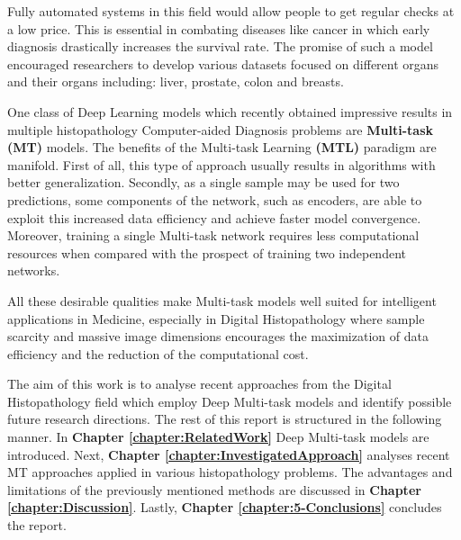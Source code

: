 Fully automated systems in this field would allow people to get regular checks at a low price. This is essential in combating diseases like cancer in which early diagnosis drastically increases the survival rate. The promise of such a model encouraged researchers to develop various datasets focused on different organs and their organs including: liver, prostate, colon and breasts.

One class of Deep Learning models which recently obtained impressive results in multiple histopathology Computer-aided Diagnosis problems are \textbf{Multi-task (MT)} models. The benefits of the Multi-task Learning \textbf{(MTL)} paradigm \cite{caruana1997multitask} are manifold. First of all, this type of approach usually results in algorithms with better generalization. Secondly, as a single sample may be used for two predictions, some components of the network, such as encoders, are able to exploit this increased data efficiency and achieve faster model convergence. Moreover, training a single Multi-task network requires less computational resources when compared with the prospect of training two independent networks. 

All these desirable qualities make Multi-task models well suited for intelligent applications in Medicine, especially in Digital Histopathology where sample scarcity and massive image dimensions encourages the maximization of data efficiency and the reduction of the computational cost. 

The aim of this work is to analyse recent approaches from the Digital Histopathology field which employ Deep Multi-task models and identify possible future research directions. The rest of this report is structured in the following manner. In \textbf{Chapter \ref{chapter:RelatedWork}} Deep Multi-task models are introduced. Next, \textbf{Chapter \ref{chapter:InvestigatedApproach}} analyses recent MT approaches applied in various histopathology problems. The advantages and limitations of the previously mentioned methods are discussed in \textbf{Chapter \ref{chapter:Discussion}}. Lastly, \textbf{Chapter \ref{chapter:5-Conclusions}} concludes the report.